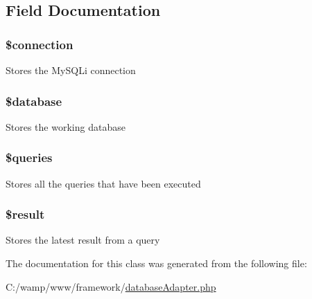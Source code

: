 \subsection{Field Documentation}
\hypertarget{class_my_s_q_li_database_a0d9c79b9b86b3f5891c6d3892f12c6a0}{
\subsubsection[{\$connection}]{\setlength{\rightskip}{0pt plus 5cm}\$connection}}
\label{class_my_s_q_li_database_a0d9c79b9b86b3f5891c6d3892f12c6a0}
Stores the MySQLi connection \hypertarget{class_my_s_q_li_database_a7691c0162d89de0b6ba47edcd8ba8878}{
\subsubsection[{\$database}]{\setlength{\rightskip}{0pt plus 5cm}\$database}}
\label{class_my_s_q_li_database_a7691c0162d89de0b6ba47edcd8ba8878}
Stores the working database \hypertarget{class_my_s_q_li_database_a576b05de2f452e4cce4e3de12667ba0f}{
\subsubsection[{\$queries}]{\setlength{\rightskip}{0pt plus 5cm}\$queries}}
\label{class_my_s_q_li_database_a576b05de2f452e4cce4e3de12667ba0f}
Stores all the queries that have been executed \hypertarget{class_my_s_q_li_database_a112ef069ddc0454086e3d1e6d8d55d07}{
\subsubsection[{\$result}]{\setlength{\rightskip}{0pt plus 5cm}\$result}}
\label{class_my_s_q_li_database_a112ef069ddc0454086e3d1e6d8d55d07}
Stores the latest result from a query 

The documentation for this class was generated from the following file:\begin{DoxyCompactItemize}
\item 
C:/wamp/www/framework/\hyperlink{database_adapter_8php}{databaseAdapter.php}\end{DoxyCompactItemize}
